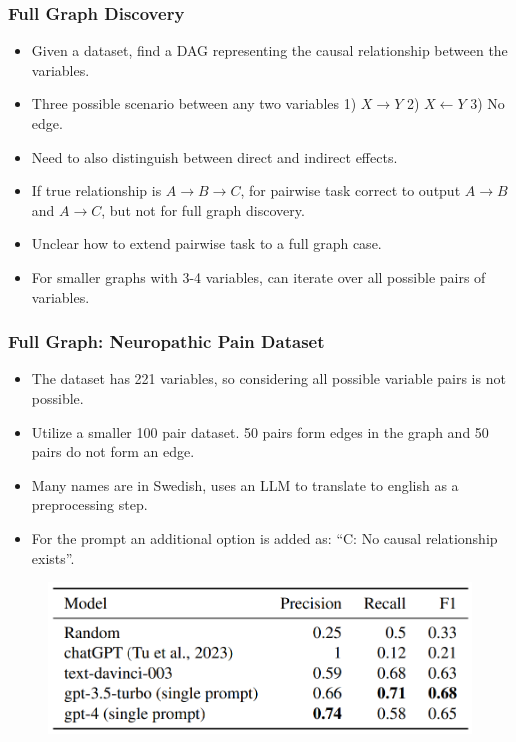 \documentclass{beamer}
\begin{document}
\begin{frame}
	\frametitle{Full Graph Discovery}
	\begin{itemize}
		\item Given a dataset, find a DAG representing the causal relationship between the variables.
		\item Three possible scenario between any two variables 1) $ X \rightarrow Y $ 2) $ X \leftarrow Y $ 3) No edge.
		\item Need to also distinguish between direct and indirect effects.
		\item If true relationship is $ A \rightarrow B \rightarrow C $, for pairwise task correct to output $ A \rightarrow B $
			and $ A \rightarrow C $, but not for full graph discovery.
		\item Unclear how to extend pairwise task to a full graph case.
		\item For smaller graphs with 3-4 variables, can iterate over all possible pairs of variables.
	\end{itemize}
\end{frame}

\begin{frame}
	\frametitle{Full Graph: Neuropathic Pain Dataset}
	\begin{itemize}
		\item The dataset has 221 variables, so considering all possible variable pairs is not possible.
		\item Utilize a smaller 100 pair dataset. 50 pairs form edges in the graph and 50 pairs do not form an edge.
		\item Many names are in Swedish, uses an LLM to translate to english as a preprocessing step.
		\item For the prompt an additional option is added as: ``C: No causal relationship exists''.
	\end{itemize}
	\begin{figure}
		\includegraphics[scale=0.4]{imgs/table6.png}
	\end{figure}
\end{frame}
\end{document}
